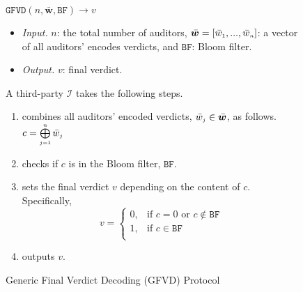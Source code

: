 \begin{figure} [H]%
\setlength{\fboxsep}{1pt}
\begin{center}
    \begin{tcolorbox}[enhanced,width=5.5in,
    drop fuzzy shadow southwest,
    colframe=black,colback=white]
    \vspace{-1.5mm}
\underline{$\mathtt{GFVD}(n,  \bar{\bm w}, \mathtt{BF})\rightarrow  v$}\\
%
\begin{itemize}
\item \noindent\textit{Input.} $n$:  the total number of  auditors,    $\bar{\bm w}=[\bar{ w}_{\scriptscriptstyle 1},..., \bar{ w}_{\scriptscriptstyle n}]$:  a vector of all auditors' encodes  verdicts, and $\mathtt{BF}$: Bloom filter.
%
\item \noindent\textit{Output.} $v$: final verdict.  
%
\end{itemize}
A third-party $\mathcal{I}$ takes the following steps.
\begin{enumerate}
%
%
\item combines  all auditors' encoded verdicts, $\bar w_{\scriptscriptstyle j}\in \bar{\bm {w}}$, as follows. 
%
$c= \bigoplus\limits^{\scriptscriptstyle n}_{\scriptscriptstyle j=1} \bar w_{\scriptscriptstyle j}$
%
%
\item checks if $c$ is in the Bloom filter, $\mathtt{BF}$. 
%
\item sets the final verdict $v$ depending on the content of $c$. Specifically, 
%
\begin{equation*}
   v= 
\begin{cases}
    0,              &\text{if } c= 0 \text{ or } c \notin\mathtt{BF}\\
   1 ,& \text{if } c \in\mathtt{BF}\\

\end{cases}
\end{equation*}
%
\item outputs  $v$. 
 \end{enumerate}
 
\end{tcolorbox}
\end{center}
\vspace{-3mm}
\caption{Generic Final Verdict Decoding  (GFVD) Protocol} 
\label{fig:GFVD}
\end{figure}


